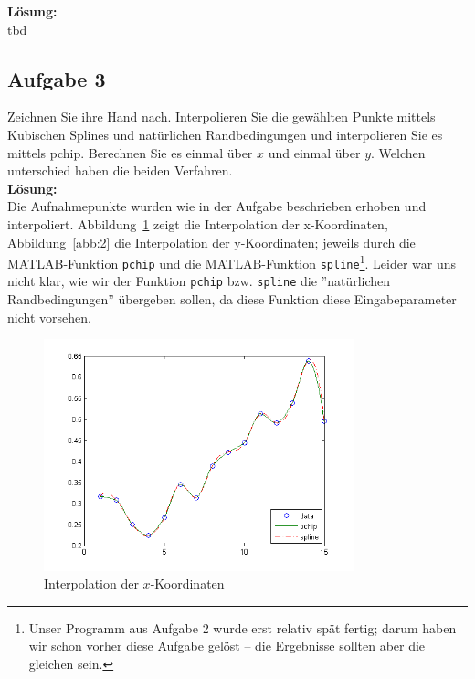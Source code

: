 \documentclass[11pt,a4paper,ngerman]{article}
\begin{document}
\textbf{Lösung:}\\

tbd

\subsection*{Aufgabe 3}

Zeichnen Sie ihre Hand nach. Interpolieren Sie die gewählten Punkte mittels Kubischen Splines und natürlichen Randbedingungen
und interpolieren Sie es mittels pchip. Berechnen Sie es einmal über $x$ und einmal über $y$. Welchen unterschied
haben die beiden Verfahren.\\

\textbf{Lösung:}\\

Die Aufnahmepunkte wurden wie in der Aufgabe beschrieben erhoben und interpoliert. Abbildung~\ref{abb:1} zeigt die Interpolation der x-Koordinaten, Abbildung~\ref{abb:2} die Interpolation der y-Koordinaten; jeweils durch  die MATLAB-Funktion \texttt{pchip} und die MATLAB-Funktion \texttt{spline}\footnote{Unser Programm aus Aufgabe 2 wurde erst relativ spät fertig; darum haben wir schon vorher diese Aufgabe gelöst -- die Ergebnisse sollten aber die gleichen sein.}.
Leider war uns nicht klar, wie wir der Funktion \texttt{pchip} bzw. \texttt{spline} die ''natürlichen Randbedingungen'' übergeben sollen, da diese Funktion diese Eingabeparameter nicht vorsehen.

\begin{figure}[h]
\centering
\includegraphics[width=0.8\textwidth]{plotX.png}
\caption{Interpolation der $x$-Koordinaten\label{abb:1}}
\end{figure}
\end{document}
